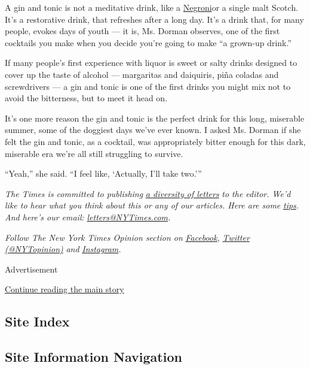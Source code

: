 A gin and tonic is not a meditative drink, like a
\href{https://www.nytimes3xbfgragh.onion/2019/06/12/opinion/negroni-2019.html}{Negroni}or
a single malt Scotch. It's a restorative drink, that refreshes after a
long day. It's a drink that, for many people, evokes days of youth ---
it is, Ms. Dorman observes, one of the first cocktails you make when you
decide you're going to make ``a grown-up drink.''

If many people's first experience with liquor is sweet or salty drinks
designed to cover up the taste of alcohol --- margaritas and daiquiris,
piña coladas and screwdrivers --- a gin and tonic is one of the first
drinks you might mix not to avoid the bitterness, but to meet it head
on.

It's one more reason the gin and tonic is the perfect drink for this
long, miserable summer, some of the doggiest days we've ever known. I
asked Ms. Dorman if she felt the gin and tonic, as a cocktail, was
appropriately bitter enough for this dark, miserable era we're all still
struggling to survive.

``Yeah,'' she said. ``I feel like, `Actually, I'll take two.'''

\emph{The Times is committed to publishing}
\href{https://www.nytimes3xbfgragh.onion/2019/01/31/opinion/letters/letters-to-editor-new-york-times-women.html}{\emph{a
diversity of letters}} \emph{to the editor. We'd like to hear what you
think about this or any of our articles. Here are some}
\href{https://help.nytimes3xbfgragh.onion/hc/en-us/articles/115014925288-How-to-submit-a-letter-to-the-editor}{\emph{tips}}\emph{.
And here's our email:}
\href{mailto:letters@NYTimes.com}{\emph{letters@NYTimes.com}}\emph{.}

\emph{Follow The New York Times Opinion section on}
\href{https://www.facebookcorewwwi.onion/nytopinion}{\emph{Facebook}}\emph{,}
\href{http://twitter.com/NYTOpinion}{\emph{Twitter (@NYTopinion)}}
\emph{and}
\href{https://www.instagram.com/nytopinion/}{\emph{Instagram}}\emph{.}

Advertisement

\protect\hyperlink{after-bottom}{Continue reading the main story}

\hypertarget{site-index}{%
\subsection{Site Index}\label{site-index}}

\hypertarget{site-information-navigation}{%
\subsection{Site Information
Navigation}\label{site-information-navigation}}

